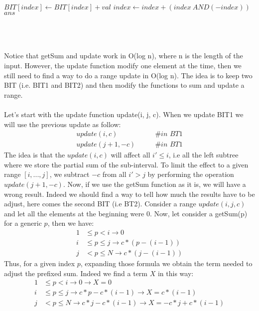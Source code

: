 \documentclass[a4paper]{article}
\begin{document}
\begin{algorithmic}
	\State $BIT[index] \gets BIT[index] +val$
	\State $index \gets index + (index \ AND (-index))$	
\EndWhile
\State \Return $ans$
\EndFunction
\end{algorithmic}
\qquad \\
\\
\\
Notice that getSum and update work in O(log n), where n is the length of the input. However, the update function modify one element at the time, then we still need to find a way to do a range update in O(log n). The idea is to keep two BIT (i.e. BIT1 and BIT2) and then modify the functions to sum and update a range. \\
\\
Let's start with the update function update(i, j, c). When we update BIT1 we will use the previous update as follow:
\begin{align*}
update(i, c)  \qquad & \# \textit{in BT1}\\ 	
update(j + 1, -c)  \qquad & \# \textit{in BT1}
\end{align*}
The idea is that the $update(i, c)$ will affect all $i' \leq i$, i.e all the left subtree where we store the partial sum of the sub-interval. To limit the effect to a given range $[i,...,j]$, we subtract $-c$ from all $i' > j$ by performing the operation $update(j+1, -c)$. Now, if we use the getSum function as it is, we will have a wrong result. Indeed we should find a way to tell how much the results have to be adjust, here comes the second BIT (i.e BT2). 
Consider a range $update(i,j,c)$ and let all the elements at the beginning were 0. Now, let consider a getSum(p) for a generic $p$, then we have:
\begin{align*}
1 & \leq p < i \longrightarrow 0 \\
i & \leq p \leq j \longrightarrow c*(p-(i-1))\\
j & < p \leq N \longrightarrow c*(j-(i-1))
\end{align*}
Thus, for a given index $p$, expanding those formula we obtain the term needed to adjust the prefixed sum. Indeed we find a term $X$ in this way:
\begin{align*}
1 & \leq p < i \longrightarrow 0 \longrightarrow X=0\\
i & \leq p \leq j \longrightarrow c*p - c*(i-1)\longrightarrow X= c*(i-1) \\
j & < p \leq N \longrightarrow c*j - c*(i-1) \longrightarrow X= -c*j + c*(i-1)
\end{align*}
\end{document}
